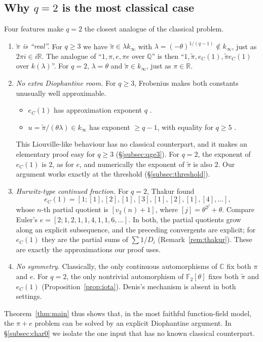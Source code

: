 \documentclass[11pt]{amsart}
\theoremstyle{remark}
\numberwithin{equation}{section}
\newcommand{\F}{\mathbb{F}}
\newcommand{\Q}{\mathbb{Q}}
\newcommand{\R}{\mathbb{R}}
\newcommand{\C}{\mathbb{C}}
\newcommand{\kinf}{k_\infty}
\newcommand{\pit}{\tilde\pi}
\newcommand{\eC}{e_C}
\begin{document}
\subsection{Why \texorpdfstring{$q=2$}{q=2} is the most classical case}
Four features make $q=2$ the closest analogue of the classical problem.
\begin{enumerate}
\item[(i)] \emph{$\pit$ is ``real''.} For $q\ge3$ we have $\pit\in\lambda\kinf$ with $\lambda=(-\theta)^{1/(q-1)}\notin\kinf$, just as $2\pi i\in i\R$. The analogue of ``$1,\pi,e,\pi e$ over $\Q$'' is then ``$1,\pit,\eC(1),\pit\eC(1)$ over $k(\lambda)$''. For $q=2$, $\lambda=\theta$ and $\pit\in\kinf$, just as $\pi\in\R$.
\item[(ii)] \emph{No extra Diophantine room.} For $q\ge3$, Frobenius makes both constants unusually well approximable.
 \begin{itemize}
 \item $\eC(1)$ has approximation exponent $q$ \cite[Thm.~1]{Tha11}.
 \item $u=\pit/(\theta\lambda)\in\kinf$ has exponent $\ge q-1$, with equality for $q\ge5$ \cite[Thm.~7]{Tha11}.
 \end{itemize}
 This Liouville-like behaviour has no classical counterpart, and it makes an elementary proof easy for $q\ge3$ (\S\ref{subsec:qge3}). For $q=2$, the exponent of $\eC(1)$ is $2$, as for $e$, and numerically the exponent of $\pit$ is also $2$. Our argument works exactly at the threshold (\S\ref{subsec:threshold}).
\item[(iii)] \emph{Hurwitz-type continued fraction.} For $q=2$, Thakur \cite{Tha92} found
 \[
 \eC(1)=[1;[1],[2],[1],[3],[1],[2],[1],[4],\dots],
 \]
 whose $n$-th partial quotient is $[v_2(n)+1]$, where $[j]=\theta^{2^j}+\theta$. Compare Euler's $e=[2;1,2,1,1,4,1,1,6,\dots]$. In both, the partial quotients grow along an explicit subsequence, and the preceding convergents are explicit; for $\eC(1)$ they are the partial sums of $\sum1/D_i$ (Remark~\ref{rem:thakur}). These are exactly the approximations our proof uses.
\item[(iv)] \emph{No symmetry.} Classically, the only continuous automorphisms of $\C$ fix both $\pi$ and $e$. For $q=2$, the only nontrivial automorphism of $\F_2[\theta]$ fixes both $\pit$ and $\eC(1)$ (Proposition~\ref{prop:iota}). Denis's mechanism is absent in both settings.
\end{enumerate}
Theorem~\ref{thm:main} thus shows that, in the most faithful function-field model, the $\pi+e$ problem can be solved by an explicit Diophantine argument. In \S\ref{subsec:char0} we isolate the one input that has no known classical counterpart.
\end{document}
